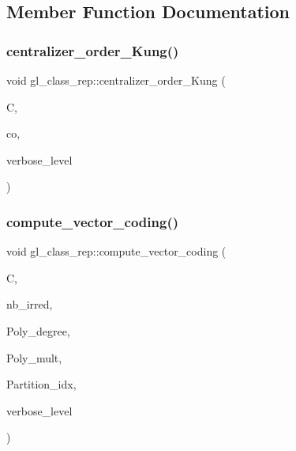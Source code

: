 \subsection{Member Function Documentation}
\mbox{\label{classgl__class__rep_abdc7ece2f243cf3d48d8e590f414e746}} 
\subsubsection{\texorpdfstring{centralizer\+\_\+order\+\_\+\+Kung()}{centralizer\_order\_Kung()}}
{\footnotesize\ttfamily void gl\+\_\+class\+\_\+rep\+::centralizer\+\_\+order\+\_\+\+Kung (\begin{DoxyParamCaption}\item[{\mbox{\hyperlink{classgl__classes}{gl\+\_\+classes}} $\ast$}]{C,  }\item[{\mbox{\hyperlink{classlonginteger__object}{longinteger\+\_\+object}} \&}]{co,  }\item[{\mbox{\hyperlink{galois_8h_a09fddde158a3a20bd2dcadb609de11dc}{I\+NT}}}]{verbose\+\_\+level }\end{DoxyParamCaption})}

\mbox{\label{classgl__class__rep_ae202478be1618fdcc5e047b40a614973}} 
\subsubsection{\texorpdfstring{compute\+\_\+vector\+\_\+coding()}{compute\_vector\_coding()}}
{\footnotesize\ttfamily void gl\+\_\+class\+\_\+rep\+::compute\+\_\+vector\+\_\+coding (\begin{DoxyParamCaption}\item[{\mbox{\hyperlink{classgl__classes}{gl\+\_\+classes}} $\ast$}]{C,  }\item[{\mbox{\hyperlink{galois_8h_a09fddde158a3a20bd2dcadb609de11dc}{I\+NT}} \&}]{nb\+\_\+irred,  }\item[{\mbox{\hyperlink{galois_8h_a09fddde158a3a20bd2dcadb609de11dc}{I\+NT}} $\ast$\&}]{Poly\+\_\+degree,  }\item[{\mbox{\hyperlink{galois_8h_a09fddde158a3a20bd2dcadb609de11dc}{I\+NT}} $\ast$\&}]{Poly\+\_\+mult,  }\item[{\mbox{\hyperlink{galois_8h_a09fddde158a3a20bd2dcadb609de11dc}{I\+NT}} $\ast$\&}]{Partition\+\_\+idx,  }\item[{\mbox{\hyperlink{galois_8h_a09fddde158a3a20bd2dcadb609de11dc}{I\+NT}}}]{verbose\+\_\+level }\end{DoxyParamCaption})}

